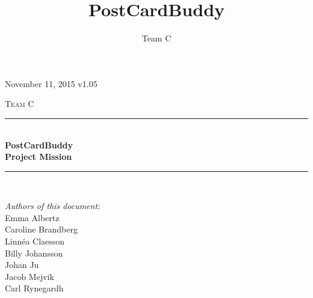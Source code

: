 \documentclass[10pt,a4paper]{article}
\title{PostCardBuddy}
\author{Team C}
\begin{document}
\begin{titlepage}
\newcommand{\HRule}{\rule{\linewidth}{0.5mm}}


\begin{flushright}
November 11, 2015 v1.05\\[3cm]
\end{flushright}


\centering
\textsc{\LARGE Team C}\\[0.5cm]

\HRule \\[0.4cm]
{ \huge \bfseries PostCardBuddy}\\[0.3cm]
{\Large \bfseries Project Mission}\\[0.4cm] %
\HRule \\[1.5cm]

\vfill
\begin{flushleft}
\textit{Authors of this document:}\\
Emma Albertz\\
Caroline Brandberg\\
Linnéa Claesson\\
Billy Johansson\\
Johan Ju\\
Jacob Mejvik\\
Carl Rynegardh
\end{flushleft}

\end{titlepage}



%



\setcounter{tocdepth}{2}
\tableofcontents
\newpage
{}




\end{document}
